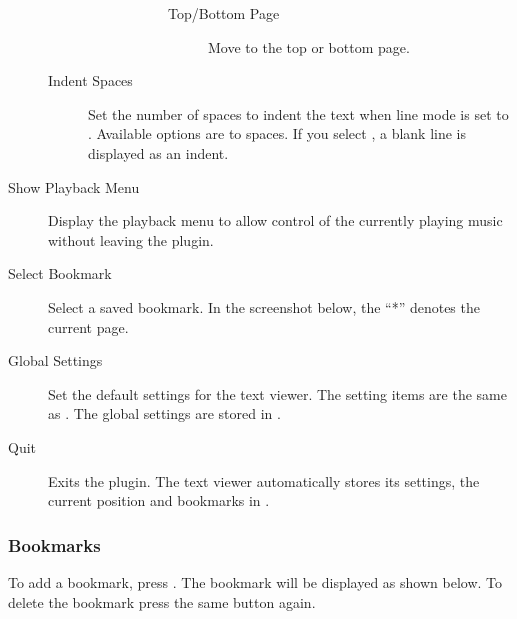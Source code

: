 \begin{description}
\begin{description}
\begin{description}
\begin{description}
\begin{description}
                        \item[Top/Bottom Page] Move to the top or bottom page.
                    \end{description}
                \end{description}
        \end{description}
    \item[Indent Spaces] Set the number of spaces to indent the text when line
      mode is set to . Available options are 
      to  spaces. If you select , a blank line is
      displayed as an indent.
    \end{description}

\item[Show Playback Menu] Display the playback menu to allow control of the
currently playing music without leaving the plugin.

\item[Select Bookmark] Select a saved bookmark. In the screenshot below, the
``*'' denotes the current page.


\item[Global Settings] Set the default settings for the text viewer.
The setting items are the same as . The global
settings are stored in
.

\item[Quit] Exits the plugin. The text viewer automatically
stores its settings, the current position and bookmarks in
.
\end{description}

\subsubsection{Bookmarks}
    To add a bookmark, press 
    .
    The bookmark will be displayed as shown below. To delete the bookmark
    press the same button again.


